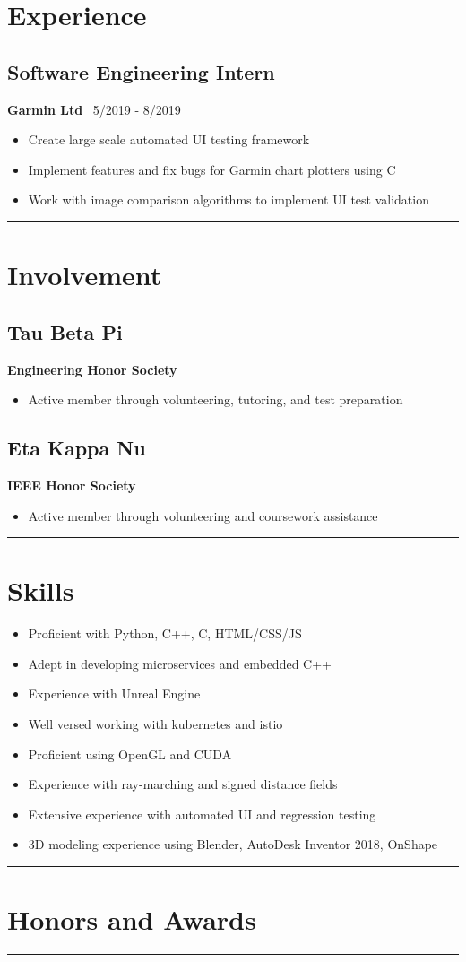 \documentclass[11pt, letterpaper]{article}
\newenvironment{desItemize}
{ \begin{itemize}[leftmargin=*, topsep=1pt]
    \setlength{\itemsep}{0pt}
    \setlength{\parskip}{0pt}
    \setlength{\parsep}{0pt}
    \small     }
{ \end{itemize}                  }
\newcommand{\columnRule}{
    \noindent\hspace{-0.5\columnsep}\rule{\columnwidth + \columnsep/2}{1pt}\noindent
}
\newenvironment{leftSection}[1]
{\section*{#1}}
{\rule{\columnwidth + \columnsep/2}{1pt}}
\newenvironment{rightSection}[1]
{\section*{#1}}
{\columnRule}
\begin{document}
\begin{multicols*}{2}[]
\begin{leftSection}{Experience}
    \subsection*{Software Engineering Intern}
    \textbf{Garmin Ltd}\hfill
    \faCalendar\ 5/2019 - 8/2019
    \begin{desItemize}
        \item	Create large scale automated UI testing framework
        \item	Implement features and fix bugs for Garmin chart plotters using C
        \item	Work with image comparison algorithms to implement UI test validation
    \end{desItemize}
\end{leftSection}
\begin{leftSection}{Involvement}
    \subsection*{Tau Beta Pi}
    \textbf{Engineering Honor Society}
    \begin{desItemize}
    \item Active member through volunteering, tutoring, and test preparation
    \end{desItemize}

    \subsection*{Eta Kappa Nu}
    \textbf{IEEE Honor Society}
    \begin{desItemize}
    \item Active member through volunteering and coursework assistance
    \end{desItemize}
\end{leftSection}
\begin{rightSection}{Skills}
    \begin{desItemize}
    \item	Proficient with Python, C++, C, HTML/CSS/JS
    \item   Adept in developing microservices and embedded C++ 
    \item   Experience with Unreal Engine
    \item   Well versed working with kubernetes and istio
    \item	Proficient using OpenGL and CUDA
    \item	Experience with ray-marching and signed distance fields
    \item	Extensive experience with automated UI and regression testing
    \item	3D modeling experience using Blender, AutoDesk Inventor 2018, OnShape
    \end{desItemize}
\end{rightSection}
\begin{rightSection}{Honors and Awards}

\end{rightSection}
\end{multicols*}
\end{document}
